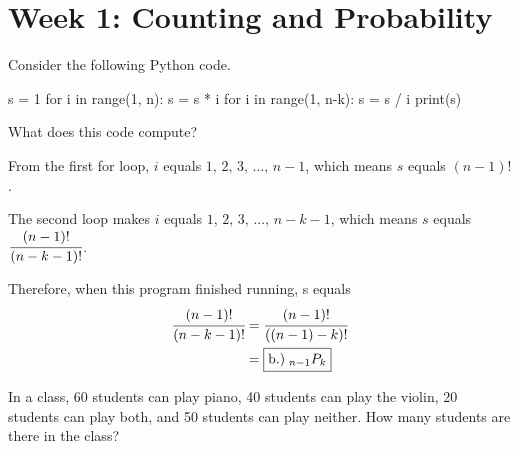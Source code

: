 \documentclass[a4paper, 10pt]{article}
\begin{document}
\subject[2110205 - Statistics for Computer Engineering]

\section{Week 1: Counting and Probability}

\begin{problem}
Consider the following Python code.

\begin{codingbox}
s = 1
for i in range(1, n):
	s = s * i
for i in range(1, n-k):
	s = s / i
print(s)
\end{codingbox}

What does this code compute?
\end{problem}

\begin{solution}
	From the first for loop, \( i \) equals \( 1,\, 2,\, 3,\, ...,\, n-1 \),
	which means \( s \) equals \( (n-1)! \). \par

	The second loop makes \( i \) equals \( 1,\, 2,\, 3,\, ...,\, n-k-1 \),
	which means \( s \) equals \( \cfrac{(n-1)!}{(n-k-1)!} \). \par

	Therefore, when this program finished running, s equals
	\begin{align*}
		\cfrac{(n-1)!}{(n-k-1)!} & = \cfrac{(n-1)!}{\left((n-1) - k\right)!} \\
		                         & = \boxed{\text{b.)}\;_{n-1}P_k}
	\end{align*}
\end{solution}

\begin{problem}
In a class, 60 students can play piano, 40 students can play the violin,
20 students can play both, and 50 students can play neither.
How many students are there in the class?
\end{problem}
\end{document}
